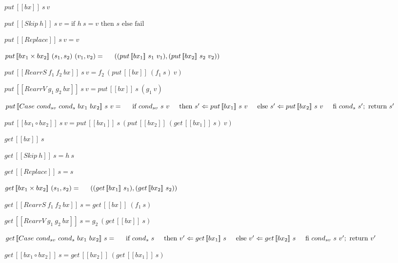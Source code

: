 \documentclass[runningheads]{llncs}
\newcommand{\tab}{\hspace*{5mm}}
\newcommand{\sif}[3]{\text{if } #1 \text{ then } #2 \text{ else } #3}
\newcommand{\product}[2]{#1 \times #2}
\newcommand{\rearrs}[3]{RearrS \ #1 \ #2 \ #3}
\newcommand{\rearrv}[3]{RearrV \ #1 \ #2 \ #3}
\newcommand{\casebx}[4]{Case \ #1 \ #2 \ #3 \ #4}
\newcommand{\putbx}[3]{put \, [\![#1]\!] \ #2 \ #3}
\newcommand{\getbx}[2]{get \, [\![#1]\!] \ #2}
\begin{document}
\begin{definition}
    $\putbx{bx}{s}{v}$

    $\putbx{Skip \ h}{s}{v} = \sif{h \ s = v}{s}{\text{fail}}$

    $\putbx{Replace}{s}{v} = v$

    $\putbx{\product{bx_1}{bx_2}}{(s_1, s_2)}{(v_1, v_2)} =\\
        \tab ((\putbx{bx_1}{s_1}{v_1}),(\putbx{bx_2}{s_2}{v_2}))$

    $\putbx{\rearrs{f_1}{f_2}{bx}}{s}{v} = f_2 \ (\putbx{bx}{(f_1 \ s)}{v})$

    $\putbx{\rearrv{g_1}{g_2}{bx}}{s}{v} = \putbx{bx}{s}{(g_1 \ v)}$

    $\putbx{\casebx{cond_{sv}}{cond_{s}}{bx_1}{bx_2}}{s}{v} = \\
        \tab \text{if} \ {cond_{sv} \ s \ v} \\
        \tab \text{then} \ s' \Leftarrow \putbx{bx_1}{s}{v} \\
        \tab \text{else} \ s' \Leftarrow \putbx{bx_2}{s}{v} \\
        \tab \text{fi} \ cond_{s} \ s'; \ \text{return} \ s'$

    $\putbx{bx_1 \circ bx_2}{s}{v} = \putbx{bx_1}{s}{(\putbx{bx_2}{(\getbx{bx_1}{s})}{v})}$
\end{definition}

\begin{definition}
    $\getbx{bx}{s}$

    $\getbx{Skip \ h}{s} = h \ s$

    $\getbx{Replace}{s} = s$

    $\getbx{\product{bx_1}{bx_2}}{(s_1,s_2)} = \\
        \tab ((\getbx{bx_1}{s_1}),(\getbx{bx_2}{s_2}))$

    $\getbx{\rearrs{f_1}{f_2}{bx}}{s} = \getbx{bx}{(f_1 \ s)}$

    $\getbx{\rearrv{g_1}{g_2}{bx}}{s} = g_2 \ (\getbx{bx}{s})$

    $\getbx{\casebx{cond_{sv}}{cond_{s}}{bx_1}{bx_2}}{s} =\\
        \tab \text{if} \ {cond_{s} \ s}\\
        \tab \text{then} \ v' \Leftarrow \getbx{bx_1}{s}\\
        \tab \text{else} \ v' \Leftarrow \getbx{bx_2}{s}\\
        \tab \text{fi} \ {cond_{sv} \ s \ v'}; \ \text{return} \ v'$

    $\getbx{bx_1 \circ bx_2}{s} = \getbx{bx_2}{(\getbx{bx_1}{s})}$
\end{definition}
\end{document}
